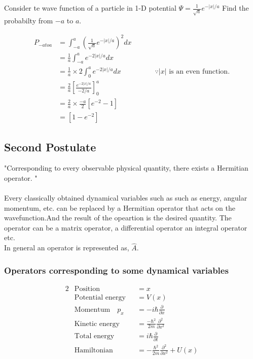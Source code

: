 \begin{exercise}
	Consider te wave function of a particle in 1-D potential $\Psi=\frac{1}{\sqrt{a}} e^{-|x|/a}$ Find the probabilty from $-a$ to $a$.
\end{exercise}
\begin{answer}
	\begin{align*}
	P_{-a to a}&=\int_{-a}^{a}(\frac{1}{\sqrt{a}}e^{-|x|/a})^{2} dx\\
	&=\frac{1}{{a}}\int_{-a}^{a}e^{-2|x|/a} dx\\
	&=\frac{1}{{a}}\times2\int_{0}^{a}e^{-2|x|/a} dx \hspace{2cm}\because |x|\text{ is an even function.}\\
	&=\frac{2}{{a}} 	\left[\frac{e^{-2|x|/a} }{-2/a} \right]_{0}^{a} \\
	&=\frac{2}{{a}}\times\frac{-a}{2} \left[e^{-2}-1 \right] \\&=\left[1-e^{-2} \right] 
	\end{align*}
\end{answer}
\subsection{Second Postulate }
"Corresponding to every observable physical quantity, there exists a Hermitian operator. "
\\\\ Every classically obtained dynamical variables such as such as energy, angular momentum, etc. can be replaced by a Hermitian operator that acts on the wavefunction.And the result of the opeartion is the desired quantity. The operator can be a matrix operator, a differential operator an integral operator etc.
\\In general an operator is represented as, $\hat{A}$.\\
\subsubsection{Operators corresponding to some dynamical variables}
\begin{alignat*}{2}
&\text{Position}&&=x\\
&\text{Potential energy}&&=V(x)\\
&\text{Momentum} \quad p_{x}&&=-i\hbar \frac{\partial}{\partial x}\\
&\text{Kinetic energy}&&=\frac{-\hbar^{2}}{2m} \frac{\partial^{2}}{\partial x^{2}}\\
&\text{Total energy}&&=i\hbar \frac{\partial}{\partial t}\\
&\text{Hamiltonian}&&=-\frac{\hbar^2}{2m}\frac{\partial^2}{\partial x^2}+U(x)
\end{alignat*}
